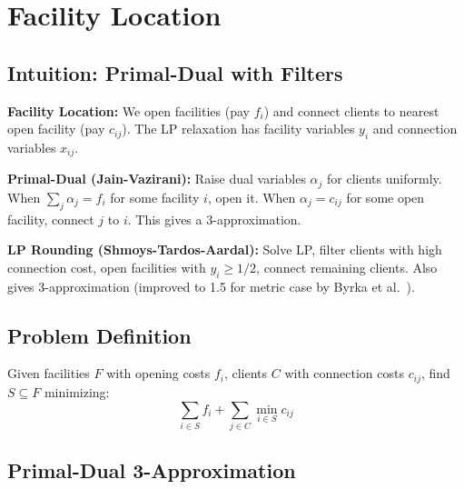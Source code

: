 \setcounter{chapter}{23}
\chapter{Facility Location}
\label{ch:facility}

\section{Intuition: Primal-Dual with Filters}

\begin{intuitionbox}
\textbf{Facility Location:} We open facilities (pay $f_i$) and connect clients to nearest open facility (pay $c_{ij}$). The LP relaxation has facility variables $y_i$ and connection variables $x_{ij}$.

\textbf{Primal-Dual (Jain-Vazirani):} Raise dual variables $\alpha_j$ for clients uniformly. When $\sum_j \alpha_j = f_i$ for some facility $i$, open it. When $\alpha_j = c_{ij}$ for some open facility, connect $j$ to $i$. This gives a 3-approximation.

\textbf{LP Rounding (Shmoys-Tardos-Aardal):} Solve LP, filter clients with high connection cost, open facilities with $y_i \geq 1/2$, connect remaining clients. Also gives 3-approximation (improved to 1.5 for metric case by Byrka et al.~\cite{byrka10}).
\end{intuitionbox}

\section{Problem Definition}

\begin{definition}
Given facilities $F$ with opening costs $f_i$, clients $C$ with connection costs $c_{ij}$, find $S \subseteq F$ minimizing:
\[
\sum_{i \in S} f_i + \sum_{j \in C} \min_{i \in S} c_{ij}
\]
\end{definition}

\section{Primal-Dual 3-Approximation}

